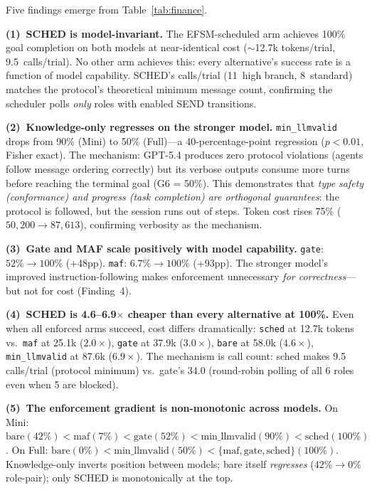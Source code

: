 Five findings emerge from Table~\ref{tab:finance}.

\textbf{(1)~SCHED is model-invariant.}
The EFSM-scheduled arm achieves 100\% goal completion on both models
at near-identical cost (${\sim}$12.7k tokens/trial, 9.5~calls/trial).
No other arm achieves this: every alternative's success rate is a
function of model capability.
SCHED's calls/trial (11~high branch, 8~standard) matches the
protocol's theoretical minimum message count, confirming the scheduler
polls \emph{only} roles with enabled SEND transitions.

\textbf{(2)~Knowledge-only regresses on the stronger model.}
\texttt{min\_llmvalid} drops from 90\% (Mini) to 50\% (Full)---a
40-percentage-point regression ($p < 0.01$, Fisher exact).
The mechanism: GPT-5.4 produces zero protocol violations (agents
follow message ordering correctly) but its verbose outputs consume
more turns before reaching the terminal goal (G6 = 50\%).
This demonstrates that \emph{type safety (conformance) and progress
(task completion) are orthogonal guarantees}: the protocol is followed,
but the session runs out of steps.
Token cost rises 75\% ($50{,}200 \to 87{,}613$), confirming verbosity
as the mechanism.

\textbf{(3)~Gate and MAF scale positively with model capability.}
\texttt{gate}: $52\% \to 100\%$ (+48pp).
\texttt{maf}: $6.7\% \to 100\%$ (+93pp).
The stronger model's improved instruction-following makes enforcement
unnecessary \emph{for correctness}---but not for cost (Finding~4).

\textbf{(4)~SCHED is 4.6--6.9$\times$ cheaper than every alternative at 100\%.}
Even when all enforced arms succeed, cost differs dramatically:
\texttt{sched} at 12.7k tokens vs.\
\texttt{maf} at 25.1k ($2.0\times$),
\texttt{gate} at 37.9k ($3.0\times$),
\texttt{bare} at 58.0k ($4.6\times$),
\texttt{min\_llmvalid} at 87.6k ($6.9\times$).
The mechanism is call count: sched makes 9.5 calls/trial (protocol
minimum) vs.\ gate's 34.0 (round-robin polling of all 6 roles even
when 5 are blocked).

\textbf{(5)~The enforcement gradient is non-monotonic across models.}
On Mini: $\text{bare}(42\%) < \text{maf}(7\%) < \text{gate}(52\%) < \text{min\_llmvalid}(90\%) < \text{sched}(100\%)$.
On Full: $\text{bare}(0\%) < \text{min\_llmvalid}(50\%) < \{\text{maf}, \text{gate}, \text{sched}\}(100\%)$.
Knowledge-only inverts position between models; bare itself
\emph{regresses} ($42\% \to 0\%$ role-pair); only SCHED is
monotonically at the top.


